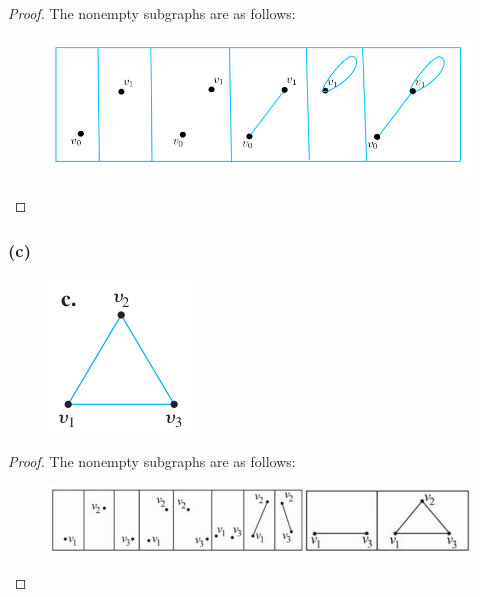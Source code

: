 \documentclass[14pt]{extarticle}
\begin{document}
\begin{proof}
The nonempty subgraphs are as follows:

\begin{figure}[ht!]
\centering
\includegraphics[scale=0.5]{../images/10.1.23.b.2.png}
\end{figure}
\end{proof}

\subsubsection{(c)}
\begin{figure}[ht!]
\centering
\includegraphics[scale=0.5]{../images/10.1.23.c.1.png}
\end{figure}

\begin{proof}
The nonempty subgraphs are as follows:

\begin{figure}[ht!]
\centering
\includegraphics[scale=0.5]{../images/10.1.23.c.2.png}
\end{figure}
\end{proof}
\end{document}
